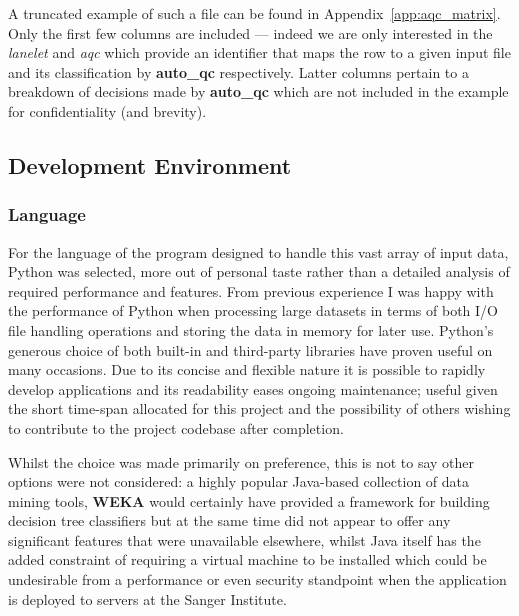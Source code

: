 A truncated example of such a file can be found in Appendix~\ref{app:aqc_matrix}.
Only the first few columns are included --- indeed we are only interested in the
\textit{lanelet} and \textit{aqc} which provide an identifier that maps the row
to a given input file and its classification by \textbf{auto\_qc} respectively.
Latter columns pertain to a breakdown of decisions made by \textbf{auto\_qc}
which are not included in the example for confidentiality (and brevity).


\subsection{Development Environment}
\subsubsection{Language}
For the language of the program designed to handle this vast array of input
data, Python was selected, more out of personal taste rather than a
detailed analysis of required performance and features. From previous experience
I was happy with the performance of Python when processing large datasets in
terms of both I/O file handling operations and storing the data in memory for
later use. Python's generous choice of both built-in and third-party libraries
have proven useful on many occasions. Due to its concise and flexible nature it
is possible to rapidly develop applications and its readability eases ongoing
maintenance; useful given the short time-span allocated for this project and the
possibility of others wishing to contribute to the project codebase after
completion.

Whilst the choice was made primarily on preference, this is not to say other
options were not considered: a highly popular Java-based collection of data
mining tools, \textbf{WEKA}\citep{weka} would certainly have provided a
framework for building decision tree classifiers but at the same time did not
appear to offer any significant features that were unavailable elsewhere, whilst
Java itself has the added constraint of requiring a virtual machine to be
installed which could be undesirable from a performance or even security
standpoint when the application is deployed to servers at the Sanger Institute.


